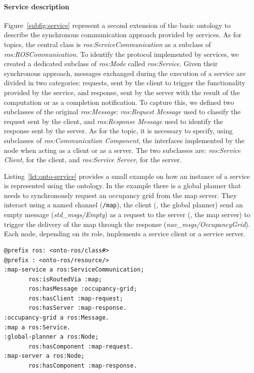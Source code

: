 \paragraph{Service description} Figure~\ref{subfig:service} represent a second extension of the basic ontology to describe the synchronous communication approach provided by services.  As for topics, the central class is \textit{ros:Service\-Com\-mu\-ni\-ca\-tion} as a subclass of \textit{ros:ROS\-Com\-mu\-ni\-ca\-tion}. To identify the protocol implemented by services, we created a dedicated subclass of \textit{ros:Mode} called \textit{ros:Service}. Given their
synchronous approach, messages exchanged during the execution of a service are divided in two categories: requests, sent by the client to trigger the functionality provided by the service, and response, sent by the server with the result of the computation or as a completion notification. To capture this, we defined two subclasses of the original \textit{ros:Message}: \textit{ros:Request Message} used to classify the request sent by the client, and \textit{ros:Response Message} used to identify the response sent by the server. As for the topic, it is necessary to specify, using subclasses of \textit{ros:Communication Component}, the interfaces implemented by the node when acting as a client or as a server. The two subclasses are: \textit{ros:Service Client}, for the client, and \textit{ros:Service Server}, for the server.

Listing~\ref{lst:onto-service} provides a small example on how an instance of a service is represented using the ontology. In the example there is a global planner that needs to synchronously request an occupancy grid from the map server. They interact using a named channel (\texttt{/map}), the client (\ie, the global planner) send an empty message (\textit{std\_msgs/Empty}) as a request to the server (\ie, the map server) to trigger the delivery of the map through the response (\textit{nav\_msgs/OccupancyGrid}). Each node, depending on its role, implements a service client or a service server.

\begin{lstlisting}[frame=tb,caption={Instance of a service-based communication according to the ontology.},label=lst:onto-service]
@prefix ros: <onto-ros/class#>
@prefix : <onto-ros/resource/>
:map-service a ros:ServiceCommunication;
       ros:isRoutedVia :map;
       ros:hasMessage :occupancy-grid;
       ros:hasClient :map-request;
       ros:hasServer :map-response.
:occupancy-grid a ros:Message.
:map a ros:Service.  
:global-planner a ros:Node;
       ros:hasComponent :map-request.
:map-server a ros:Node;
       ros:hasComponent :map-response.
 \end{lstlisting}
 
